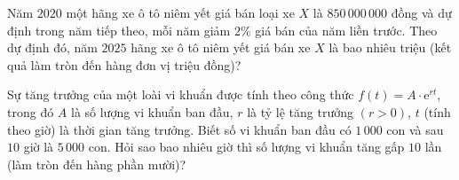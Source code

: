 \begin{bt}%

	Năm $2020$ một hãng xe ô tô niêm yết giá bán loại xe $X$ là $850\,000\,000$ đồng và dự định trong năm tiếp theo, mỗi năm giảm $2\%$ giá bán của năm liền trước. Theo dự định đó, năm $2025$ hãng xe ô tô niêm yết giá bán xe $X$ là bao nhiêu triệu (kết quả làm tròn đến hàng đơn vị triệu đồng)? 
\end{bt}

\begin{bt}%

	Sự tăng trưởng của một loài vi khuẩn được tính theo công thức $f(t)=A\cdot \mathrm{e}^{rt}$, trong đó $A$ là số lượng vi khuẩn ban đầu, $r$ là tỷ lệ tăng trưởng $(r>0)$, $t$ (tính theo giờ) là thời gian tăng trưởng. Biết số vi khuẩn ban đầu có $1\,000$ con và sau $10$ giờ là $5\,000$ con. Hỏi sao bao nhiêu giờ thì số lượng vi khuẩn tăng gấp $10$ lần (làm tròn đến hàng phần mười)?
\end{bt}

